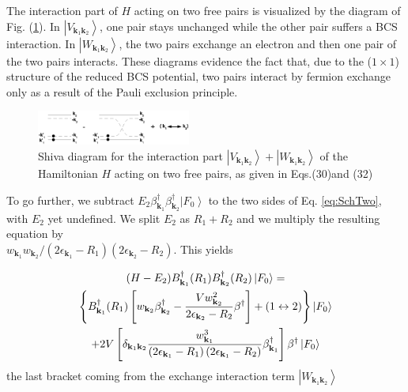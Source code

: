 \documentclass[epj]{svjour}
\begin{document}
The interaction part of $H$ acting on two free pairs is  visualized by
the diagram of Fig. (\ref{fig:twoP}). In $\left|V_{\mathbf{k} _1\mathbf{k} _2}\right>$, one pair stays unchanged while the other pair suffers a BCS interaction. In $\left|W_{\mathbf{k} _1\mathbf{k} _2}\right>$, the two pairs exchange an electron and then one pair of the two pairs interacts.   These diagrams evidence the fact that,
due to the ($1\times1$) structure of the reduced BCS potential,  two pairs 
 interact by fermion exchange only as a result of the
Pauli exclusion principle.

\begin{figure}[htb]
   \includegraphics[width=0.45\textwidth]{twoPair.eps}
\caption{Shiva diagram for the interaction part $\left|V_{\mathbf{k} _1\mathbf{k} _2}\right>+\left|W_{\mathbf{k} _1\mathbf{k} _2}\right>$ of the Hamiltonian $H$ acting on two free pairs, as given in Eqs.(30)and (32)}
\label{fig:twoP}
\end{figure}


To go further, we subtract $E _2\beta^{\dagger}_{\mathbf{k}
_1}\beta^{\dagger}_{\mathbf{k} _2}\left|F_0\right>  $ to the two sides of Eq.%
\eqref{eq:SchTwo}, with $E _2$ yet undefined. We split $E _2$ as $R_1+R_2$ and we multiply
the resulting equation by \\$w_{\mathbf{k} _1}w_{\mathbf{k} _2}/\left(2%
\epsilon_{\mathbf{k} _1}-R_1\right) \left(2\epsilon_{\mathbf{k}
_2}-R_2\right) $. This yields


\begin{multline}  \label{eq:SchTwo2}
(H-E _2)B^{\dagger}_{\mathbf{k} _1}(R_1)B^{\dagger}_{\mathbf{k}
_2}(R_2)\left|F_0\right>   = \\
\left\{B^{\dagger}_{\mathbf{k} _1}(R_1)\left[w_{\mathbf{k}
_2}\beta^{\dagger}_{\mathbf{k} _2}-\frac{Vw_{\mathbf{k} _2}^2}{2\epsilon_{%
\mathbf{k} _2}-R_2}\beta^{\dagger}\right]+(1\leftrightarrow2)\right\}
\left|F_0\right>  \\
+2V\left[\delta_{{\mathbf{k} _1}{\mathbf{k} _2}}\frac{w^3_{{\mathbf{k} _1}}}{\left(2%
\epsilon_{\mathbf{k} _1}-R_1\right) \left(2\epsilon_{\mathbf{k}
_1}-R_2\right)}\beta^\dagger_{{\mathbf{k} _1}}\right]\beta^\dagger\left|F_0\right>  
\end{multline}
the last bracket coming from the exchange interaction term $\left|W_{\mathbf{k} _1\mathbf{k} _2}\right>$
\end{document}
